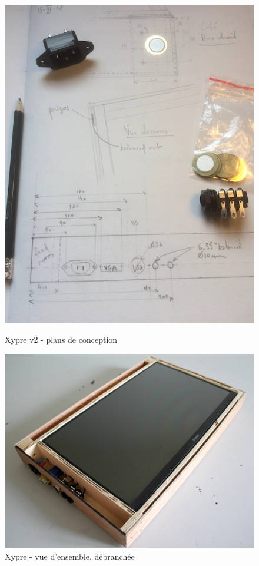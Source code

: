 \begin{figure}[!htbp]
	\captionsetup{format=plain}%
	\centering
	\begin{minipage}[t]{0.365\textwidth}
		\includegraphics[width=\linewidth]{gfx/05_interfaces/Xypre_plan01_72dpi.jpg}
		\caption{Xypre v2 - plans de conception}
		\label{fig:interface:xypre_plans}
	\end{minipage}
	\hspace{.01\linewidth}
	\begin{minipage}[t]{0.6\textwidth}
	    \includegraphics[width=\linewidth]{gfx/05_interfaces/xypre_overview_unplugged.jpg}
		\caption{Xypre - vue d'ensemble, débranchée}
		\label{fig:interface:xypre}
	\end{minipage}
\end{figure}
